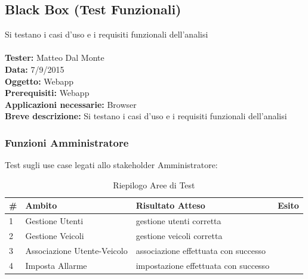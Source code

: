 \documentclass[a4paper,12pt]{article}
\begin{document}
\pagebreak

\subsection{Black Box (Test Funzionali)}
Si testano i casi d'uso e i requisiti funzionali dell'analisi\\ \\
\textbf{Tester:} Matteo Dal Monte\\
\textbf{Data:} 7/9/2015\\
\textbf{Oggetto:} Webapp\\
\textbf{Prerequisiti:} Webapp\\
\textbf{Applicazioni necessarie:} Browser\\
\textbf{Breve descrizione:} Si testano i casi d'uso e i requisiti funzionali dell'analisi\\

\subsubsection{Funzioni Amministratore}
Test sugli use case legati allo stakeholder Amministratore:

\begin{table}[H]
\begin{center}
\caption{Riepilogo Aree di Test}
\begin{tabular}{l l l l}
\rowcolor{Ash}
\hline
\# & Ambito & Risultato Atteso & Esito \\ \hline
1 & Gestione Utenti				&		gestione utenti corretta				&\cellcolor{green}{OK}\\
2 & Gestione Veicoli				&		gestione veicoli corretta				&\cellcolor{green}{OK}\\
3 & Associazione Utente-Veicolo	&		associazione effettuata con successo	&\cellcolor{green}{OK}\\
4 & Imposta Allarme				&		impostazione effettuata con successo	& \cellcolor{green}{OK}\\ \hline
\end{tabular}
\end{center}
\end{table}
\end{document}
